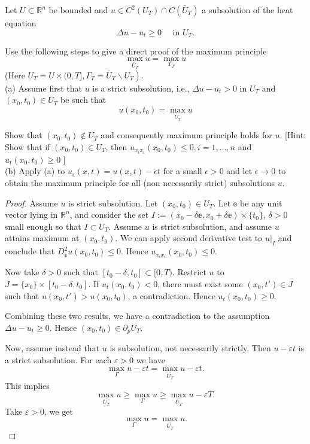 
\begin{problem}
	Let $U \subset \mathbb{R}^n$ be bounded and $u \in C^2\left(U_T\right) \cap C\left(\bar{U}_T\right)$ a subsolution of the heat equation
\[
\Delta u-u_t \geq 0 \quad \text { in } U_T .
\]

Use the following steps to give a direct proof of the maximum principle
\[
\max _{\bar{U}_T} u=\max _{\Gamma_T} u
\]
(Here $\left.U_T=U \times(0, T], \Gamma_T=\bar{U}_T \backslash U_T\right)$.\\
(a) Assume first that $u$ is a strict subsolution, i.e., $\Delta u-u_t>0$ in $U_T$ and $\left(x_0, t_0\right) \in \bar{U}_T$ be such that
\[
u\left(x_0, t_0\right)=\max _{\bar{U}_T} u
\]

Show that $\left(x_0, t_0\right) \notin U_T$ and consequently maximum principle holds for $u$.
[Hint: Show that if $\left(x_0, t_0\right) \in U_T$, then $u_{x_i x_i}\left(x_0, t_0\right) \leq 0, i=1, \ldots, n$ and $u_t\left(x_0, t_0\right) \geq 0$ ]\\
(b) Apply (a) to $u_\epsilon(x, t)=u(x, t)-\epsilon t$ for a small $\epsilon>0$ and let $\epsilon \rightarrow 0$ to obtain the maximum principle for all (non necessarily strict) subsolutions $u$.
\end{problem}
\begin{proof}
	Assume $u$ is strict subsolution.
	Let $(x_0, t_0) \in U_T$. Let $\mathbb{e}$ be any unit vector lying in $\mathbb{R}^n$, and consider the set $I := (x_0 - \delta \mathbb{e}, x_0 + \delta \mathbb{e}) \times \{t_0\} $, $\delta>0$ small enough so that $I \subset U_T$. Assume $u$ is strict subsolution, and assume $u$ attains maximum at $(x_0, t_0)$. We can apply second derivative test to $u|_I$ and conclude that $D_{\mathbb{e}}^2 u (x_0, t_0) \le 0$. Hence $u_{x_i x_i }(x_0, t_0) \le 0$.

	Now take $\delta>0$ such that $[t_0 - \delta, t_0] \subset [0,T)$. Restrict $u$ to $J = \{x_0\} \times [t_0-\delta, t_0]$. If $u_t(x_0, t_0) < 0$, there must exist some $(x_0, t') \in J$ such that $u(x_0, t') > u(x_0, t_0)$, a contradiction. Hence $u_t(x_0, t_0) \ge 0$. 

	Combining these two results, we have a contradiction to the assumption $\Delta u - u_t \ge 0$. Hence  $(x_0, t_0) \in \partial_p U_T$.

	Now, assume instead that $u$ is subsolution, not necessarily strictly. Then $u - \varepsilon t$ is a strict subsolution. For each $\varepsilon>0$ we have
	\[
		\max_{\Gamma} u - \varepsilon t = \max_{\overline{U_T} } u - \varepsilon t
	.\] 
	This implies
	\[
		\max_{\overline{U_T} } u 
		\ge  \max_{\Gamma} u \ge \max_{\overline{U_T} } u - \varepsilon T
	.\] 
	Take $\varepsilon > 0$, we get
	\[
		\max_{\Gamma} u = \max_{\overline{U_T} } u 
	.\] 
\end{proof}

